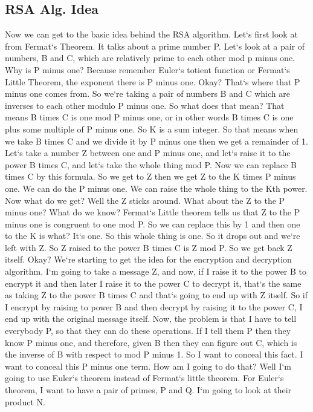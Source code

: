\subsection{RSA Alg.
Idea}
Now we can get to the basic idea behind the RSA algorithm.
Let`s first look at from Fermat`s Theorem.
It talks about a prime number P\@.
Let`s look at a pair of numbers, B and C, which are relatively prime to each other mod p minus one.
Why is P minus one? Because remember Euler`s totient function or Fermat`s Little Theorem, the exponent there is P minus one.
Okay? That`s where that P minus one comes from.
So we`re taking a pair of numbers B and C which are inverses to each other modulo P minus one.
So what does that mean? That means B times C is one mod P minus one, or in other words B times C is one plus some multiple of P minus one.
So K is a sum integer.
So that means when we take B times C and we divide it by P minus one then we get a remainder of 1.
Let`s take a number Z between one and P minus one, and let`s raise it to the power B times C, and let`s take the whole thing mod P\@.
Now we can replace B times C by this formula.
So we get to Z then we get Z to the K times P minus one.
We can do the P minus one.
We can raise the whole thing to the Kth power.
Now what do we get? Well the Z sticks around.
What about the Z to the P minus one? What do we know? Fermat`s Little theorem tells us that Z to the P minus one is congruent to one mod P\@.
So we can replace this by 1 and then one to the K is what? It`s one.
So this whole thing is one.
So it drops out and we`re left with Z\@.
So Z raised to the power B times C is Z mod P\@.
So we get back Z itself.
Okay? We`re starting to get the idea for the encryption and decryption algorithm.
I`m going to take a message Z, and now, if I raise it to the power B to encrypt it and then later I raise it to the power C to decrypt it, that`s the same as taking Z to the power B times C and that`s going to end up with Z itself.
So if I encrypt by raising to power B and then decrypt by raising it to the power C, I end up with the original message itself.
Now, the problem is that I have to tell everybody P, so that they can do these operations.
If I tell them P then they know P minus one, and therefore, given B then they can figure out C, which is the inverse of B with respect to mod P minus 1.
So I want to conceal this fact.
I want to conceal this P minus one term.
How am I going to do that? Well I`m going to use Euler`s theorem instead of Fermat`s little theorem.
For Euler`s theorem, I want to have a pair of primes, P and Q\@.
I`m going to look at their product N\@.
